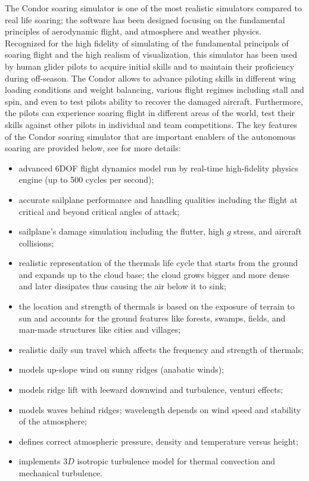 \documentclass[letterpaper, 10 pt, conference]{ieeeconf}  %
\begin{document}

The Condor soaring simulator is one of the most realistic simulators compared
to real life soaring; the software has been designed focusing on the
fundamental principles of aerodynamic flight, and atmosphere and weather
physics. Recognized for the high fidelity of simulating of the fundamental
principals of soaring flight and the high realism of visualization, this
simulator has been used by human glider pilots to acquire initial skills and
to maintain their proficiency during off-season. The Condor allows to advance
piloting skills in different wing loading conditions and weight balancing,
various flight regimes including stall and spin, and even to test pilots
ability to recover the damaged aircraft. Furthermore, the pilots can
experience soaring flight in different areas of the world, test their skills
against other pilots in individual and team competitions. The key features of
the Condor soaring simulator that are important enablers of the autonomous
soaring are provided below, see \cite{Condor:2013:Online} for more details:
\begin{itemize}
  \item advanced 6DOF flight dynamics model run by real-time high-fidelity
      physics engine (up to 500 cycles per second);
  \item accurate sailplane performance and handling qualities including the
      flight at critical and beyond critical angles of attack;
  \item sailplane's damage simulation including the flutter, high $g$
      stress, and aircraft collisions;
  \item realistic representation of the thermals life cycle that starts
      from the ground and expands up to the cloud base; the cloud grows
      bigger and more dense and later dissipates thus causing the air below
      it to sink;
  \item the location and strength of thermals is based on the exposure of
      terrain to sun and accounts for the ground features like forests,
      swamps, fields, and man-made structures like cities and villages;
  \item realistic daily sun travel which affects the frequency and strength
      of thermals;
  \item models up-slope wind on sunny ridges (anabatic winds);
  \item models ridge lift with leeward downwind and turbulence, venturi
      effects;
  \item models waves behind ridges; wavelength depends on wind speed and
      stability of the atmosphere;
  \item defines correct atmospheric pressure, density and temperature
      versus height;
  \item implements $3D$ isotropic turbulence model for thermal convection
      and mechanical turbulence.
\end{itemize}
\end{document}

